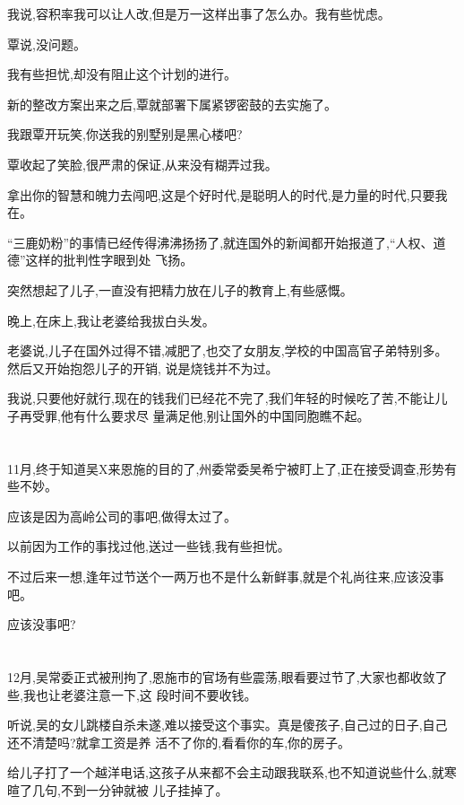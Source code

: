 \documentclass[11pt]{article}
\begin{document}
我说,容积率我可以让人改,但是万一这样出事了怎么办。我有些忧虑。

覃说,没问题。

我有些担忧,却没有阻止这个计划的进行。

新的整改方案出来之后,覃就部署下属紧锣密鼓的去实施了。

我跟覃开玩笑,你送我的别墅别是黑心楼吧?

覃收起了笑脸,很严肃的保证,从来没有糊弄过我。

拿出你的智慧和魄力去闯吧,这是个好时代,是聪明人的时代,是力量的时代,只要我在。

``三鹿奶粉''的事情已经传得沸沸扬扬了,就连国外的新闻都开始报道了,``人权、道德''这样的批判性字眼到处
飞扬。

突然想起了儿子,一直没有把精力放在儿子的教育上,有些感慨。

晚上,在床上,我让老婆给我拔白头发。

老婆说,儿子在国外过得不错,减肥了,也交了女朋友,学校的中国高官子弟特别多。然后又开始抱怨儿子的开销,
说是烧钱并不为过。

我说,只要他好就行,现在的钱我们已经花不完了,我们年轻的时候吃了苦,不能让儿子再受罪,他有什么要求尽
量满足他,别让国外的中国同胞瞧不起。



\section{}
11月,终于知道吴X来恩施的目的了,州委常委吴希宁被盯上了,正在接受调查,形势有些不妙。

应该是因为高岭公司的事吧,做得太过了。

以前因为工作的事找过他,送过一些钱,我有些担忧。

不过后来一想,逢年过节送个一两万也不是什么新鲜事,就是个礼尚往来,应该没事吧。

应该没事吧?



\section{}
12月,吴常委正式被刑拘了,恩施市的官场有些震荡,眼看要过节了,大家也都收敛了些,我也让老婆注意一下,这
段时间不要收钱。

听说,吴的女儿跳楼自杀未遂,难以接受这个事实。真是傻孩子,自己过的日子,自己还不清楚吗?就拿工资是养
活不了你的,看看你的车,你的房子。

给儿子打了一个越洋电话,这孩子从来都不会主动跟我联系,也不知道说些什么,就寒暄了几句,不到一分钟就被
儿子挂掉了。
\end{document}
